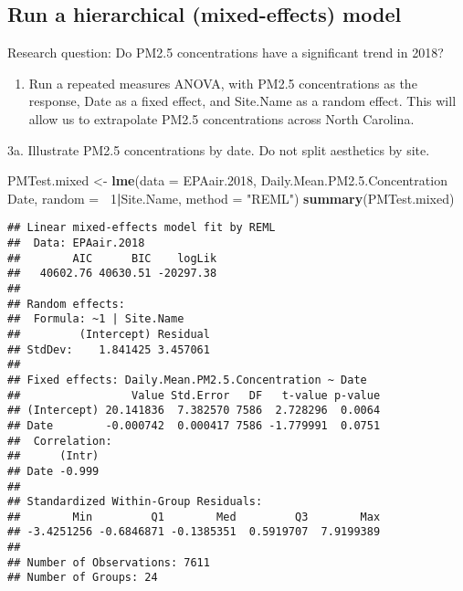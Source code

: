 \documentclass[]{article}
\newenvironment{Shaded}{\begin{snugshade}}{\end{snugshade}}
\newcommand{\KeywordTok}[1]{\textcolor[rgb]{0.13,0.29,0.53}{\textbf{#1}}}
\newcommand{\DataTypeTok}[1]{\textcolor[rgb]{0.13,0.29,0.53}{#1}}
\newcommand{\DecValTok}[1]{\textcolor[rgb]{0.00,0.00,0.81}{#1}}
\newcommand{\FloatTok}[1]{\textcolor[rgb]{0.00,0.00,0.81}{#1}}
\newcommand{\StringTok}[1]{\textcolor[rgb]{0.31,0.60,0.02}{#1}}
\newcommand{\OperatorTok}[1]{\textcolor[rgb]{0.81,0.36,0.00}{\textbf{#1}}}
\newcommand{\NormalTok}[1]{#1}
\providecommand{\tightlist}{%
  \setlength{\itemsep}{0pt}\setlength{\parskip}{0pt}}
\begin{document}
\subsection{Run a hierarchical (mixed-effects)
model}\label{run-a-hierarchical-mixed-effects-model}

Research question: Do PM2.5 concentrations have a significant trend in
2018?

\begin{enumerate}
\def\labelenumi{\arabic{enumi}.}
\setcounter{enumi}{2}
\tightlist
\item
  Run a repeated measures ANOVA, with PM2.5 concentrations as the
  response, Date as a fixed effect, and Site.Name as a random effect.
  This will allow us to extrapolate PM2.5 concentrations across North
  Carolina.
\end{enumerate}

3a. Illustrate PM2.5 concentrations by date. Do not split aesthetics by
site.

\begin{Shaded}
\begin{Highlighting}[]
\NormalTok{PMTest.mixed <-}\StringTok{ }\KeywordTok{lme}\NormalTok{(}\DataTypeTok{data =}\NormalTok{ EPAair.}\DecValTok{2018}\NormalTok{,}
\NormalTok{                     Daily.Mean.PM2.}\FloatTok{5.}\NormalTok{Concentration }\OperatorTok{~}\StringTok{ }\NormalTok{Date,}
                    \DataTypeTok{random =} \OperatorTok{~}\DecValTok{1}\OperatorTok{|}\NormalTok{Site.Name, }\DataTypeTok{method =} \StringTok{"REML"}\NormalTok{)}
\KeywordTok{summary}\NormalTok{(PMTest.mixed)}
\end{Highlighting}
\end{Shaded}

\begin{verbatim}
## Linear mixed-effects model fit by REML
##  Data: EPAair.2018 
##        AIC      BIC    logLik
##   40602.76 40630.51 -20297.38
## 
## Random effects:
##  Formula: ~1 | Site.Name
##         (Intercept) Residual
## StdDev:    1.841425 3.457061
## 
## Fixed effects: Daily.Mean.PM2.5.Concentration ~ Date 
##                 Value Std.Error   DF   t-value p-value
## (Intercept) 20.141836  7.382570 7586  2.728296  0.0064
## Date        -0.000742  0.000417 7586 -1.779991  0.0751
##  Correlation: 
##      (Intr)
## Date -0.999
## 
## Standardized Within-Group Residuals:
##        Min         Q1        Med         Q3        Max 
## -3.4251256 -0.6846871 -0.1385351  0.5919707  7.9199389 
## 
## Number of Observations: 7611
## Number of Groups: 24
\end{verbatim}
\end{document}
